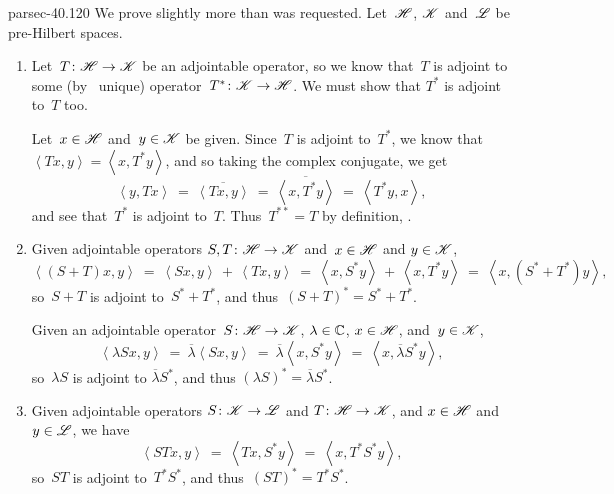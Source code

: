 \documentclass[b5page]{book}
\begin{document}
\begin{solution}{parsec-40.120}%
We prove slightly more than was requested.
Let~$\mathscr{H}$, $\mathscr{K}$ and~$\mathscr{L}$ be pre-Hilbert spaces.
\begin{enumerate}
\item
Let~$T\colon \mathscr{H}\to\mathscr{K}$ be an adjointable operator,
        so we know that~$T$ is adjoint to some (by~
        unique) operator~$T^*\colon \mathscr{K}\to\mathscr{H}$.
We must show that $T^*$ is adjoint to~$T$ too.

Let~$x\in\mathscr{H}$ and~$y\in\mathscr{K}$ be given.
Since~$T$ is adjoint to~$T^*$,
we know that~$\left<Tx,y\right>=\left<x,T^*y\right>$,
and so taking the complex conjugate, we get
        \begin{equation*}
\left<y,Tx\right>\  =\  
    \overline{\left<Tx,y\right>}
    \ =\ 
    \overline{\left<x,T^*y\right>}
    \ =\ \left<T^*y,x\right>,
\end{equation*}
and see that~$T^*$ is adjoint to~$T$.
        Thus~$T^{**}=T$ by definition, .

\item
Given adjointable operators
$S,T\colon \mathscr{H}\to\mathscr{K}$ 
and~$x\in \mathscr{H}$ and $y\in \mathscr{K}$,
\begin{equation*}
\left<(S+T)x,y\right>
\ =\  \left<Sx,y\right>\,+\,\left<Tx,y\right>
\ =\ \left<x,S^*y\right>\,+\,\left<x,T^*y\right>
    \ =\ \left<x,(S^*+T^*)y\right>,
\end{equation*}
so~$S+T$ is adjoint to~$S^*+T^*$,
and thus~$(S+T)^*=S^*+T^*$.

Given an adjointable operator~$S\colon \mathscr{H}\to\mathscr{K}$,
$\lambda\in\mathbb{C}$, $x\in\mathscr{H}$, and~$y\in\mathscr{K}$,
\begin{equation*}
\left<\lambda Sx,y\right>
\ = \ 
    \overline{\lambda} \left<Sx, y\right>
\ = \ 
    \overline{\lambda} \left<x, S^*y\right>
\ = \ 
     \left<x, \overline{\lambda}S^*y\right>,
\end{equation*}
so~$\lambda S$ is adjoint to $\overline{\lambda}S^*$,
and thus $(\lambda S)^*=\overline{\lambda}S^*$.
\item
Given adjointable operators
$S\colon \mathscr{K}\to\mathscr{L}$
and $T\colon \mathscr{H}\to\mathscr{K}$,
and
$x\in\mathscr{H}$  and $y\in\mathscr{L}$,
we have
\begin{equation*}
\left<STx,y\right>
\ = \ \left<Tx,S^*y\right>
\ = \ \left<x,T^*S^*y\right>,
\end{equation*}
so~$ST$ is adjoint to~$T^*S^*$,
        and thus~$(ST)^*=T^*S^*$.
\end{enumerate}
\end{solution}
\end{document}
